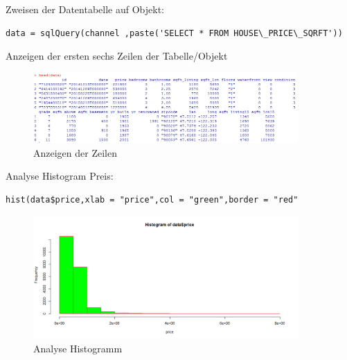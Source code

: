 Zweisen der Datentabelle auf Objekt:
\begin{lstlisting}
data = sqlQuery(channel ,paste('SELECT * FROM HOUSE\_PRICE\_SQRFT'))
\end{lstlisting}

Anzeigen der ersten sechs Zeilen der Tabelle/Objekt
\begin{figure}[!htb]
        \begin{minipage}{1\textwidth}
                \centering
                \includegraphics[width=0.90\textwidth]{pics/tutor2.png}\par\vspace{0cm}
                \caption{Anzeigen der Zeilen}
                \label{fig:tutor2}
        \end{minipage}
\end{figure}

Analyse Histogram Preis:
\begin{lstlisting}
hist(data$price,xlab = "price",col = "green",border = "red"
\end{lstlisting}

\begin{figure}[!htb]
        \begin{minipage}{1\textwidth}
                \centering
                \includegraphics[width=0.90\textwidth]{pics/tutor3.png}\par\vspace{0cm}
                \caption{Analyse Histogramm}
                \label{fig:tutor3}
        \end{minipage}
\end{figure}

